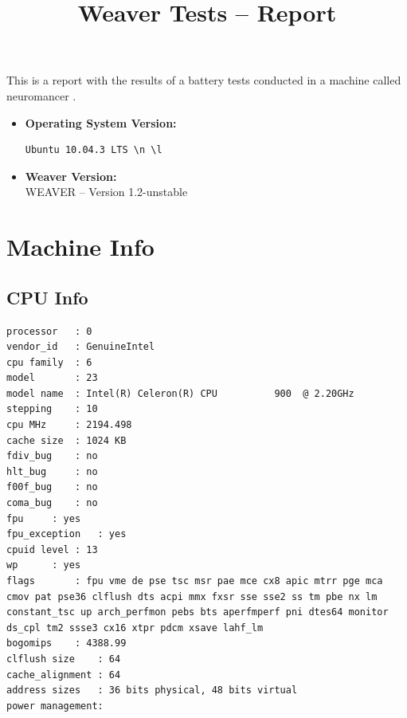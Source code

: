 \documentclass{article}
\title{Weaver Tests -- Report}
\begin{document}
\maketitle
This is a report with the results of a battery
tests conducted in a machine called 
neuromancer
.
\begin{itemize}
\item
\textbf{Operating System Version: }
\begin{verbatim}
Ubuntu 10.04.3 LTS \n \l

\end{verbatim}
\item
\textbf{Weaver Version: }\\
WEAVER -- Version 1.2-unstable
\end{itemize}
\section{Machine Info}
\subsection{CPU Info}
\begin{verbatim}
processor	: 0
vendor_id	: GenuineIntel
cpu family	: 6
model		: 23
model name	: Intel(R) Celeron(R) CPU          900  @ 2.20GHz
stepping	: 10
cpu MHz		: 2194.498
cache size	: 1024 KB
fdiv_bug	: no
hlt_bug		: no
f00f_bug	: no
coma_bug	: no
fpu		: yes
fpu_exception	: yes
cpuid level	: 13
wp		: yes
flags		: fpu vme de pse tsc msr pae mce cx8 apic mtrr pge mca cmov pat pse36 clflush dts acpi mmx fxsr sse sse2 ss tm pbe nx lm constant_tsc up arch_perfmon pebs bts aperfmperf pni dtes64 monitor ds_cpl tm2 ssse3 cx16 xtpr pdcm xsave lahf_lm
bogomips	: 4388.99
clflush size	: 64
cache_alignment	: 64
address sizes	: 36 bits physical, 48 bits virtual
power management:

\end{verbatim}
\end{document}
